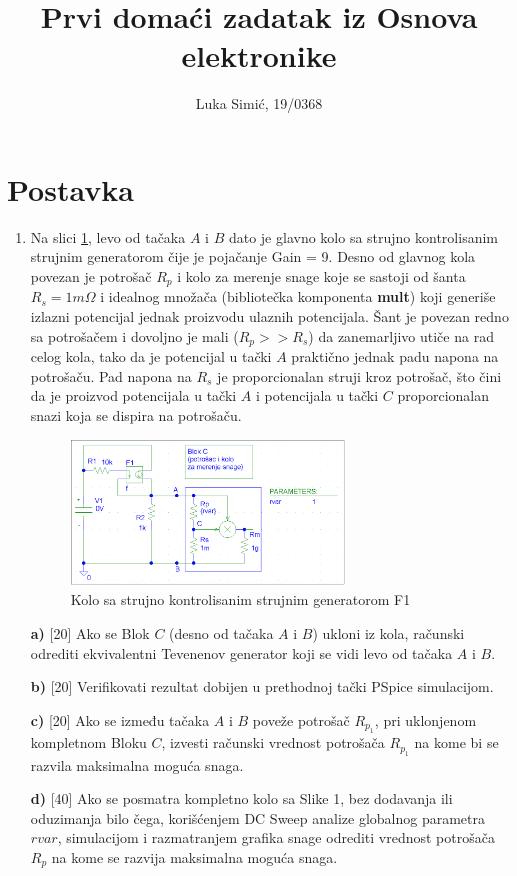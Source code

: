 \documentclass{article}
\title{Prvi domaći zadatak iz Osnova elektronike}
\author{Luka Simić, 19/0368}
\date{}
\begin{document}
\begin{titlepage}
    \maketitle
\end{titlepage}

\section{Postavka}
\begin{enumerate}[itemsep=\baselineskip]
    \item Na slici \ref{KoloZadatak}, levo od tačaka $A$ i $B$ dato je glavno kolo sa strujno kontrolisanim strujnim generatorom čije je pojačanje Gain = 9. Desno od glavnog kola povezan je potrošač $R_p$ i kolo za merenje snage koje se sastoji od šanta $R_s=1m\Omega$ i idealnog množača (bibliotečka komponenta \textbf{mult}) koji generiše izlazni potencijal jednak proizvodu ulaznih potencijala. Šant je povezan redno sa potrošačem i dovoljno je mali ($R_p >> R_s$) da zanemarljivo utiče na rad celog kola, tako da je potencijal u tački $A$ praktično jednak padu napona na potrošaču. Pad napona na $R_s$ je proporcionalan struji kroz potrošač, što čini da je proizvod potencijala u tački $A$ i potencijala u tački $C$ proporcionalan snazi koja se dispira na potrošaču.
    \begin{figure}[H]
        \centering
        \includegraphics[width=275px]{Zadatak.png}
        \caption{Kolo sa strujno kontrolisanim strujnim generatorom F1}
        \label{KoloZadatak}
    \end{figure}
    \textbf{a)} [20] Ako se Blok $C$ (desno od tačaka $A$ i $B$) ukloni iz kola, računski odrediti ekvivalentni Tevenenov generator koji se vidi levo od tačaka $A$ i $B$.

    \textbf{b)} [20] Verifikovati rezultat dobijen u prethodnoj tački PSpice simulacijom.

    \textbf{c)} [20] Ako se između tačaka $A$ i $B$ poveže potrošač $R_{p_1}$, pri uklonjenom kompletnom Bloku $C$, izvesti računski vrednost potrošača $R_{p_1}$ na kome bi se razvila maksimalna moguća snaga.

    \textbf{d)} [40] Ako se posmatra kompletno kolo sa Slike 1, bez dodavanja ili oduzimanja bilo čega, korišćenjem DC Sweep analize globalnog parametra $rvar$, simulacijom i razmatranjem grafika snage odrediti vrednost potrošača $R_p$ na kome se razvija maksimalna moguća snaga.
\end{enumerate}
\end{document}
